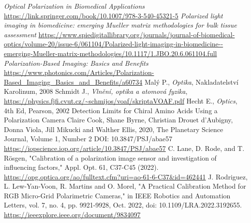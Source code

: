 \documentclass[a4paper]{article}
\numberwithin{equation}{section}
\begin{document}
    \newpage
    \begin{thebibliography}{99}
         \textit{Optical Polarization in Biomedical Applications} \url{https://link.springer.com/book/10.1007/978-3-540-45321-5}
         \textit{Polarized light imaging in biomedicine: emerging Mueller matrix methodologies for bulk tissue assessment} \url{https://www.spiedigitallibrary.org/journals/journal-of-biomedical-optics/volume-20/issue-6/061104/Polarized-light-imaging-in-biomedicine--emerging-Mueller-matrix-methodologies/10.1117/1.JBO.20.6.061104.full}
         \textit{Polarization-Based Imaging: Basics and Benefits} \url{https://www.photonics.com/Articles/Polarization-Based_Imaging_Basics_and_Benefits/a60734}
         Malý P., \textit{Optika}, Nakladatelství Karolinum, 2008
         Schmidt J., \textit{Vlnění, optika a atomová fyzika}, \url{https://physics.fjfi.cvut.cz/~schmijos/voaf/skriptaVOAF.pdf}
         Hecht E., \textit{Optics}, 4th Ed, Pearson, 2002
         Detection Limits for Chiral Amino Acids Using a Polarization Camera
        Claire Cook, Shane Byrne, Christian Drouet d'Aubigny, Donna Viola, Jill Mikucki and Walther Ellis, 2020, The Planetary Science Journal, Volume 1, Number 2 DOI: 10.3847/PSJ/abae57
        \url{https://iopscience.iop.org/article/10.3847/PSJ/abae57}
         C. Lane, D. Rode, and T. Rösgen, "Calibration of a polarization image sensor and investigation of influencing factors," Appl. Opt.  61, C37-C45 (2022). \url{https://opg.optica.org/ao/fulltext.cfm?uri=ao-61-6-C37&id=462441}
         J. Rodriguez, L. Lew-Yan-Voon, R. Martins and O. Morel, "A Practical Calibration Method for RGB Micro-Grid Polarimetric Cameras," in IEEE Robotics and Automation Letters, vol. 7, no. 4, pp. 9921-9928, Oct. 2022, doi: 10.1109/LRA.2022.3192655. \url{https://ieeexplore.ieee.org/document/9834097}

\end{thebibliography}
\end{document}
